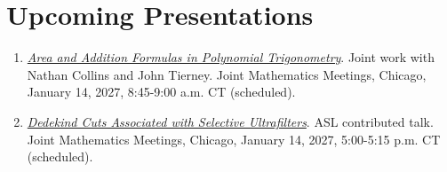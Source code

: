 \documentclass[10pt,letterpaper]{article}
\begin{document}
\section*{Upcoming Presentations}
\begin{enumerate}
\item \emph{\href{https://meetings.ams.org/math/jmm2027/meetingapp.cgi/Paper/71465}{Area and Addition Formulas in Polynomial Trigonometry}}. Joint work with Nathan Collins and John Tierney. Joint Mathematics Meetings, Chicago, January 14, 2027, 8:45-9:00 a.m. CT (scheduled).
\item \emph{\href{https://meetings.ams.org/math/jmm2027/meetingapp.cgi/Paper/71445}{Dedekind Cuts Associated with Selective Ultrafilters}}. ASL contributed talk. Joint Mathematics Meetings, Chicago, January 14, 2027, 5:00-5:15 p.m. CT (scheduled).
\end{enumerate}
\end{document}
